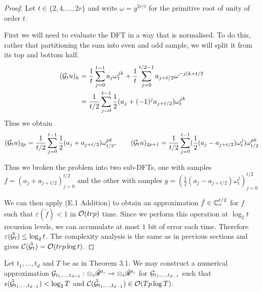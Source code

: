 \begin{proof}

    Let $t \in \{2, 4, \ldots, 2r\}$ and write $\omega = y^{2r/t}$ for the primitive root of unity of order $t$. 

    First we will need to evaluate the DFT in a way that is normalised. To do this, rather that partitioning the sum into even and odd sample, we will split it from its top and bottom half. 
    \begin{align*}
        (\mathcal G_t u)_k 
        &= \frac{1}{t}\sum^{t - 1}_{j=0} a_j \omega_t^{jk} + \frac{1}{t} \sum^{t/2 - 1}_{j=0} a_{j + t/2} \omega^{-j(k + t/2}\\
        &= \frac{1}{t/2}\sum^{t - 1}_{j=0} \frac{1}{2}(a_j + (-1)^ja_{j + t/2})\omega_t^{jk} \\
    \end{align*}
    Thus we obtain
    \[
        (\mathcal G_t u)_{2p} = \frac{1}{t/2}\sum^{t - 1}_{j=0} \frac{1}{2}(a_j + a_{j + t/2})\omega_{t/2}^{pk}, \qquad (\mathcal G_t u)_{2p + 1} = \frac{1}{t/2}\sum^{t - 1}_{j=0} (\frac{1}{2}(a_j - a_{j + t/2})\omega_t^j)\omega_{t/2}^{pk}
    \]

    Thus we broken the problem into two sub-DFTs, one with samples $f = (a_j + a_{j + t/2})_{j=0}^{t/2}$ and the other with samples $g = (\frac{1}{2}(a_j - a_{j + t/2})\omega_t^j)_{j=0}^{t/2}$

    We can then apply (E.1 Addition) to obtain an approximation $\tilde{f} \in {\mathbb C}^{t/2}_\circ$ for $f$ such that $\varepsilon(\tilde{f}) < 1$ in $\mathcal O(trp)$ time. Since we perform this operation at $\log_2 t$ recursion levels, we can accumulate at most $1$ bit of error each time. Therefore $\varepsilon(\tilde{\mathcal G}_t) \le \log_2 t$.
    The complexity analysis is the same as in previous sections and gives $\mathcal C(\tilde{\mathcal G}_t) = \mathcal O(trp \log t)$.
\end{proof}

\begin{proposition}
    Let $t_1, \ldots, t_d$ and $T$ be as in Theorem 3.1. We may construct a numerical approximation $\mathcal G_{t_1, \ldots, t_{d-1}}: \otimes_i \tilde{\mathscr{R}}^{t_i} \to \otimes_i \tilde{\mathscr{R}}^{t_i}$ for $\mathcal G_{t_1, \ldots, t_{d-1}}$ such that $\epsilon(\tilde{\mathcal G}_{t_1, \ldots, t_{d-1}}) < \log_2 T$ and $\mathcal C(\tilde{\mathcal G}_{t_1, \ldots, t_{d-1}}) \in \mathcal O(Tp \log T)$.
\end{proposition}

